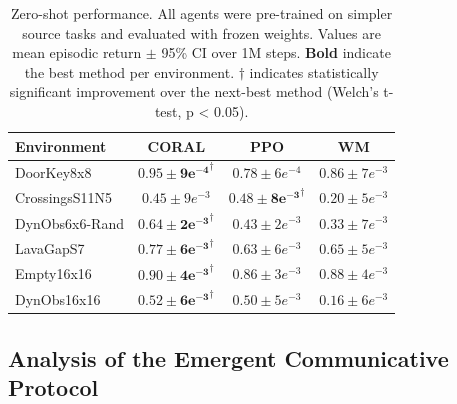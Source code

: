 \documentclass[letterpaper]{article} %
\begin{document}
\begin{table}[!ht]
\centering
\footnotesize
\setlength{\tabcolsep}{3.1pt}
\begin{tabular}{@{}lccc@{}}
\toprule
\textbf{Environment} & \textcolor[HTML]{923BE5}{CORAL} & \textcolor[HTML]{339332}{PPO} & \textcolor[HTML]{DD264A}{WM} \\
\midrule 
DoorKey8x8 &  $\mathbf{0.95\pm9e^{-4}}^{\dag}$ & $0.78\pm6e^{-4}$ & $0.86\pm7e^{-3}$\\
CrossingsS11N5 & $0.45\pm9e^{-3}$ & $\mathbf{0.48\pm8e^{-3}}^{\dag}$ & $0.20\pm5e^{-3}$ \\
DynObs6x6-Rand & $\mathbf{0.64\pm2e^{-3}}^{\dag}$ & $0.43\pm2e^{-3}$ & $0.33\pm7e^{-3}$ \\
LavaGapS7 & $\mathbf{0.77\pm6e^{-3}}^{\dag}$ & $0.63 \pm 6e^{-3}$ & $0.65\pm5e^{-3}$\\
Empty16x16 & $\mathbf{0.90\pm 4e^{-3}}^{\dag}$ & $0.86\pm 3e^{-3}$ & $0.88\pm4e^{-3}$ \\
DynObs16x16 & $\mathbf{0.52\pm6e^{-3}}^{\dag}$ & $0.50\pm5e^{-3}$ & $0.16\pm6e^{-3}$ \\
\bottomrule
\end{tabular}
\vspace{-5pt}
\caption{Zero-shot performance. All agents were pre-trained on simpler source tasks and evaluated with frozen weights. Values are mean episodic return $\pm$ 95\% CI over 1M steps. \textbf{Bold} indicate the best method per environment. ${\dag}$ indicates statistically significant improvement over the next-best method (Welch’s t-test, p < 0.05).}
\label{table: MaxPerGeneralization}
\vspace{-5pt}
\end{table}


\subsection{Analysis of the Emergent Communicative Protocol}


\end{document}
